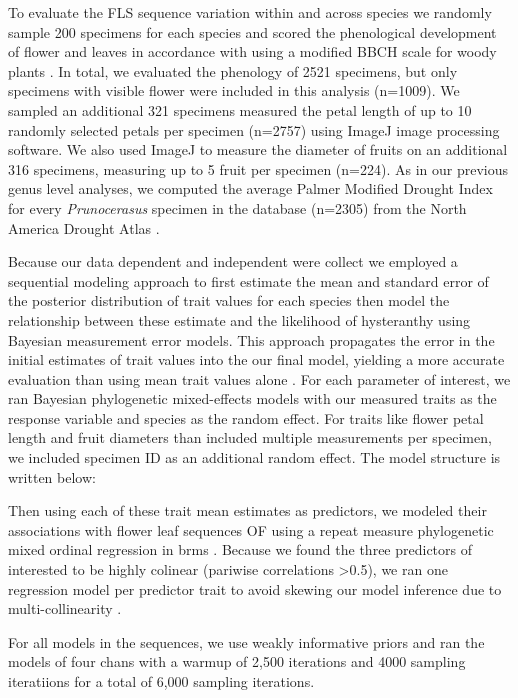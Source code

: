 \documentclass{article}\usepackage[]{graphicx}\usepackage[]{color}
\begin{document}
\noindent To evaluate the FLS sequence variation within and across species we randomly sample 200 specimens for each species and scored the phenological development of flower and leaves in accordance with using a modified BBCH scale for woody plants \citep{Finn2007}. In total, we evaluated the phenology of 2521 specimens, but only specimens with visible flower were included in this analysis (n=1009). We sampled an additional 321 specimens measured the petal length of up to 10 randomly selected petals per specimen (n=2757) using ImageJ image processing software. We also used ImageJ to measure the diameter of fruits on an additional 316 specimens, measuring up to 5 fruit per specimen (n=224). %
As in our previous genus level analyses, we computed the average Palmer Modified Drought Index for every \textit{Prunocerasus} specimen in the database (n=2305) from the North America Drought Atlas \citep{}.

\noindent Because our data dependent and independent were collect we employed a sequential modeling approach to first estimate the mean and standard error of the posterior distribution of trait values for each species then model the relationship between these estimate and the likelihood of hysteranthy using Bayesian measurement error models. This approach propagates the error in the initial estimates of trait values into the our final model, yielding a more accurate evaluation than using mean trait values alone \citep{}. For each parameter of interest, we ran Bayesian phylogenetic mixed-effects models with our measured traits as the response variable and species as the random effect. For traits like flower petal length and fruit diameters than included multiple measurements per specimen, we included specimen ID as an additional random effect. The model structure is written below:

\noindent Then using each of these trait mean estimates as predictors, we modeled their associations with flower leaf sequences OF using a repeat measure phylogenetic mixed ordinal regression in brms \citep{}. Because we found the three predictors of interested to be highly colinear (pariwise correlations >0.5), we ran one regression model per predictor trait to avoid skewing our model inference due to multi-collinearity \citep{MacElreath, Nations}.

For all models in the sequences, we use weakly informative priors and ran the models of four chans with a warmup of 2,500 iterations and 4000 sampling iteratiions for a total of 6,000 sampling iterations.
\end{document}
